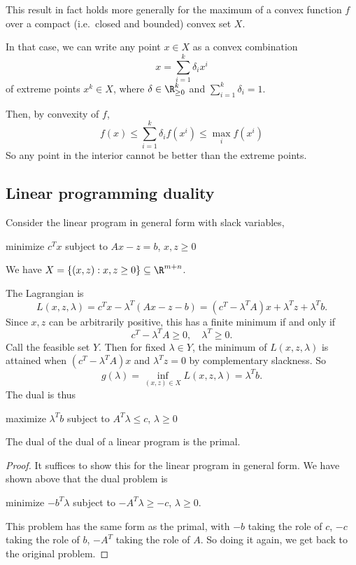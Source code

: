 \documentclass[a4paper]{article}
\begin{document}
This result in fact holds more generally for the maximum of a convex function $f$ over a compact (i.e.\ closed and bounded) convex set $X$.

In that case, we can write any point $x\in X$ as a convex combination
\[
  x = \sum_{i = 1}^k \delta_i x^i
\]
of extreme points $x^k\in X$, where $\delta \in \R_{\geq 0}^k$ and $\sum_{i=1}^k \delta_i = 1$.

Then, by convexity of $f$,
\[
  f(x) \leq \sum_{i = 1}^k \delta_i f(x^i) \leq \max_i f(x^i)
\]
So any point in the interior cannot be better than the extreme points.
\subsection{Linear programming duality}
Consider the linear program in general form with slack variables,
\begin{center}
  minimize $c^Tx$ subject to $Ax - z = b$, $x, z\geq 0$
\end{center}
We have $X = \{(x, z): x, z\geq 0\}\subseteq \R^{m + n}$.

The Lagrangian is
\[
  L(x, z, \lambda) = c^Tx - \lambda^T(A x - z - b) = (c^T - \lambda^TA)x + \lambda^T z + \lambda^T b.
\]
Since $x, z$ can be arbitrarily positive, this has a finite minimum if and only if
\[
  c^T - \lambda^TA \geq 0,\quad \lambda^T \geq 0.
\]
Call the feasible set $Y$. Then for fixed $\lambda\in Y$, the minimum of $L(x, z, \lambda)$ is attained when $(c^T - \lambda^T A)x$ and $\lambda^T z = 0$ by complementary slackness. So
\[
  g(\lambda) = \inf_{(x, z) \in X} L(x, z, \lambda) = \lambda^T b.
\]
The dual is thus
\begin{center}
  maximize $\lambda^T b$ subject to $A^T\lambda \leq c$, $\lambda \geq 0$
\end{center}

\begin{thm}
  The dual of the dual of a linear program is the primal.
\end{thm}

\begin{proof}
  It suffices to show this for the linear program in general form. We have shown above that the dual problem is
  \begin{center}
    minimize $-b^T\lambda$ subject to $-A^T \lambda \geq -c$, $\lambda \geq 0$.
  \end{center}
  This problem has the same form as the primal, with $-b$ taking the role of $c$, $-c$ taking the role of $b$, $-A^T$ taking the role of $A$. So doing it again, we get back to the original problem.
\end{proof}
\end{document}
